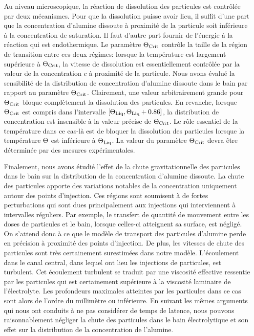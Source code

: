 Au niveau microscopique, la réaction de dissolution des particules est
contrôlée par deux mécanismes. Pour que la dissolution puisse avoir
lieu, il suffit d'une part que la concentration d'alumine dissoute à
proximité de la particule soit inférieure à la concentration de
saturation. Il faut d'autre part fournir de l'énergie à la réaction
qui est endothermique. Le paramètre $\Theta_\text{Crit}$ contrôle la taille de la
région de transition entre ces deux régimes: lorsque la température
est largement supérieure à $\Theta_\text{Crit}$, la vitesse de dissolution est
essentiellement contrôlée par la valeur de la concentration $c$ à
proximité de la particule. Nous avons évalué la sensibilité de la
distribution de concentration d'alumine dissoute dans le bain par
rapport au paramètre $\Theta_\text{Crit}$. Clairement, une valeur arbitrairement
grande pour $\Theta_\text{Crit}$ bloque complètement la dissolution des
particules. En revanche, lorsque $\Theta_\text{Crit}$ est compris dans
l'intervalle $[\Theta_\text{Liq}, \Theta_\text{Liq} + 0.86]$, la distribution de concentration
est insensible à la valeur précise de $\Theta_\text{Crit}$. Le rôle essentiel de
la température dans ce cas-là est de bloquer la dissolution des
particules lorsque la température $\Theta$ est inférieure à
$\Theta_\text{Liq}$. La valeur du paramètre $\Theta_\text{Crit}$ devra être déterminée
par des mesures expérimentales.

Finalement, nous avons étudié l'effet de la chute gravitationnelle des
particules dans le bain sur la distribution de la concentration
d'alumine dissoute. La chute des particules apporte des variations
notables de la concentration uniquement autour des points
d'injection. Ces régions sont soumisent à de fortes perturbations qui
sont dues principalement aux injections qui interviennent à
intervalles réguliers. Par exemple, le transfert de quantité de
mouvement entre les doses de particules et le bain, lorsque celles-ci
atteignent sa surface, est négligé. On s'attend donc à ce que le
modèle de transport des particules d'alumine perde en précision à
proximité des points d'injection. De plus, les vitesses de chute des
particules sont très certainement surestimées dans notre
modèle. L'écoulement dans le canal central, dans lequel ont lieu les
injections de particules, est turbulent. Cet écoulement turbulent se
traduit par une viscosité effective ressentie par les particules qui
est certainement supérieure à la viscosité laminaire de
l'électrolyte. Les profondeurs maximales atteintes par les particules
dans ce cas sont alors de l'ordre du millimètre ou inférieure. En
suivant les mêmes arguments qui nous ont conduits à ne pas considérer
de temps de latence, nous pouvons raisonnablement négliger la chute
des particules dans le bain électrolytique et son effet sur la
distribution de la concentration de l'alumine.


